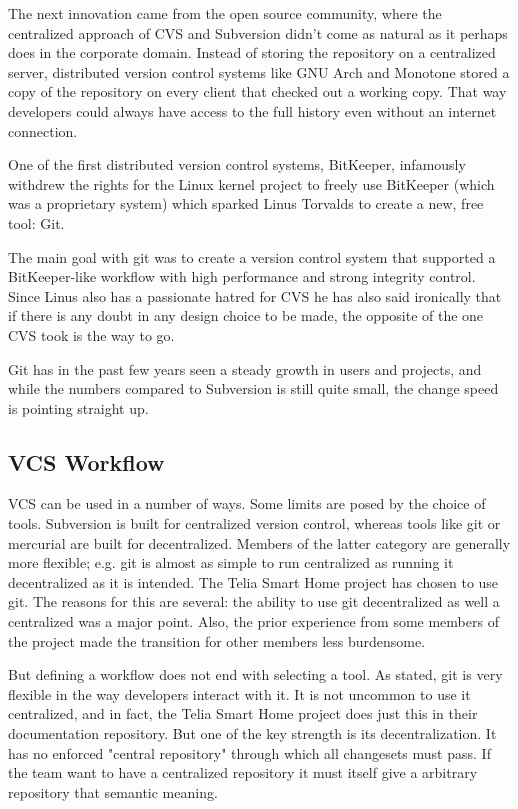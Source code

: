 \documentclass{llncs}
\begin{document}
The next innovation came from the open source community, where the
centralized approach of CVS and Subversion didn't come as natural as
it perhaps does in the corporate domain. Instead of storing the
repository on a centralized server, distributed version control
systems like GNU Arch and Monotone stored a copy of the repository on
every client that checked out a working copy. That way developers
could always have access to the full history even without an internet
connection.

One of the first distributed version control systems, BitKeeper,
infamously withdrew the rights for the Linux kernel project to freely
use BitKeeper (which was a proprietary system) which sparked Linus
Torvalds to create a new, free tool: Git. 

The main goal with git was to create a version control system that
supported a BitKeeper-like workflow with high performance and strong
integrity control. Since Linus also has a passionate hatred for CVS he
has also said ironically that if there is any doubt in any design
choice to be made, the opposite of the one CVS took is the way to go.

Git has in the past few years seen a steady growth in users and
projects, and while the numbers compared to Subversion is still quite
small, the change speed is pointing straight up.

\subsection{VCS Workflow}

VCS can be used in a number of ways. Some limits are posed by the choice
of tools. Subversion is built for centralized version control, whereas
tools like git or mercurial are built for decentralized. Members of the 
latter category are generally more flexible; e.g. git is almost as simple 
to run centralized as running it decentralized as it is intended. The 
Telia Smart Home project has chosen to use git. The reasons for this are
several: the ability to use git decentralized as well a centralized was a
major point. Also, the prior experience from some members of the project
made the transition for other members less burdensome.

But defining a workflow does not end with selecting a tool. As stated, 
git is very flexible in the way developers interact with it. It is not
uncommon to use it centralized, and in fact, the Telia Smart Home project
does just this in their documentation repository. But one of the key 
strength is its decentralization. It has no enforced "central repository"
through which all changesets must pass. If the team want to have a 
centralized repository it must itself give a arbitrary repository that
semantic meaning.
\end{document}
